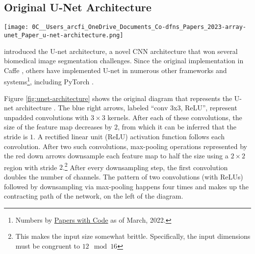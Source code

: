 \documentclass[10pt,twocolumn,english,format=sigplan,screen,balance]{acmart}
\begin{document}
\subsection{Original U-Net Architecture}

\begin{figure*}
\texttt{[image: 0C\_\_Users\_arcfi\_OneDrive\_Documents\_Co-dfns\_Papers\_2023-array-unet\_Paper\_u-net-architecture.png]}

\caption{Original u-net architecture, as seen in the original paper \citep{unet}.
Arrows represent operations between the multi-channel feature maps
represented by the rectangles. The number on top of each rectangle
is its number of channels and the numbers in the lower-left corner
are the $x$ and $y$ dimensions of the feature maps.}
\label{fig:unet-architecture}
\end{figure*}
\citet{unet} introduced the U-net architecture, a novel CNN architecture
that won several biomedical image segmentation challenges. Since the
original implementation in Caffe \citep{caffe}, others have implemented
U-net in numerous other frameworks and systems\footnote{Numbers by \href{https://paperswithcode.com/paper/u-net-convolutional-networks-for-biomedical}{Papers with Code}
as of March, 2022.}, including PyTorch \citep{pytorch}. 

Figure \ref{fig:unet-architecture} shows the original diagram that
represents the U-net architecture \citep{unet}. The blue right arrows,
labeled “conv 3x3, ReLU”, represent unpadded convolutions with
$3\times3$ kernels. After each of these convolutions, the size of
the feature map decreases by $2$, from which it can be inferred that
the stride \citep{conv-arithmetic-guide} is $1$. A rectified linear
unit (ReLU) \citep{relu} activation function follows each convolution.
After two such convolutions, max-pooling operations represented by
the red down arrows downsample each feature map to half the size using
a $2\times2$ region with stride $2$.\footnote{This makes the input size somewhat brittle. Specifically, the input
dimensions must be congruent to $12\mod16$} After every downsampling step, the first convolution doubles the
number of channels. The pattern of two convolutions (with ReLUs) followed
by downsampling via max-pooling happens four times and makes up the
contracting path of the network, on the left of the diagram.
\end{document}

